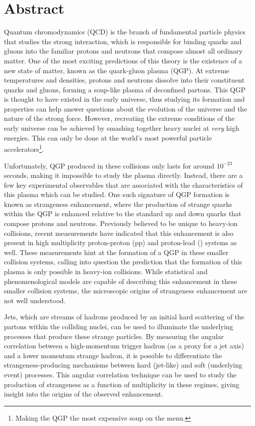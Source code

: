 \chapter{Abstract}

Quantum chromodynamics (QCD) is the branch of fundamental particle physics that studies the strong interaction, which is responsible for binding quarks and gluons into the familiar protons and neutrons that compose almost all ordinary matter. One of the most exciting predictions of this theory is the existence of a new state of matter, known as the quark-gluon plasma (QGP). At extreme temperatures and densities, protons and neutrons dissolve into their constituent quarks and gluons, forming a soup-like plasma of deconfined partons. This QGP is thought to have existed in the early universe, thus studying its formation and properties can help answer questions about the evolution of the universe and the nature of the strong force. However, recreating the extreme conditions of the early universe can be achieved by smashing together heavy nuclei at \textit{very} high energies. This can only be done at the world's most powerful particle accelerators\footnote{Making the QGP the most expensive soup on the menu.}.

Unfortunately, QGP produced in these collisions only lasts for around $10^{-23}$ seconds, making it impossible to study the plasma directly. Instead, there are a few key experimental observables that are associated with the characteristics of this plasma which can be studied. One such signature of QGP formation is known as strangeness enhancement, where the production of strange quarks within the QGP is enhanced relative to the standard up and down quarks that compose protons and neutrons. Previously believed to be unique to heavy-ion collisions, recent measurements have indicated that this enhancement is also present in high multiplicity proton-proton (pp) and proton-lead (\pPb) systems as well. These measurements hint at the formation of a QGP in these smaller collision systems, calling into question the prediction that the formation of this plasma is only possible in heavy-ion collisions. While statistical and phenomenological models are capable of describing this enhancement in these smaller collision systems, the microscopic origins of strangeness enhancement are not well understood.

Jets, which are streams of hadrons produced by an initial hard scattering of the partons within the colliding nuclei, can be used to illuminate the underlying processes that produce these strange particles. By measuring the angular correlation between a high-momentum trigger hadron (as a proxy for a jet axis) and a lower momentum strange hadron, it is possible to differentiate the strangeness-producing mechanisms between hard (jet-like) and soft (underlying event) processes. This angular correlation technique can be used to study the production of strangeness as a function of multiplicity in these regimes, giving insight into the origins of the observed enhancement. 

